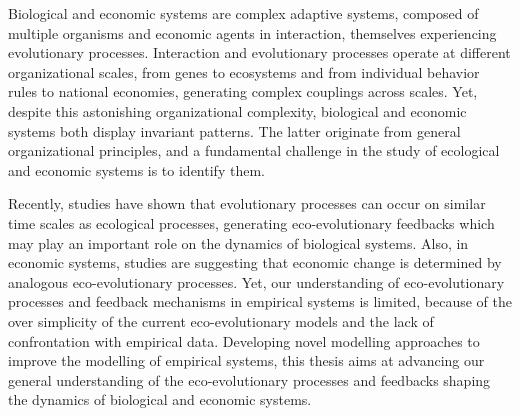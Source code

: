 %
\label{sec:summary}
\small{
Biological and economic systems are complex adaptive systems, composed of multiple organisms and economic agents in interaction, themselves experiencing evolutionary processes.
% 
Interaction and evolutionary processes operate at different organizational scales, from genes to ecosystems and from individual behavior rules to national economies, generating complex couplings across scales. Yet, despite this astonishing organizational complexity, biological and economic systems both display invariant patterns. 
% 
%
The latter originate from general organizational principles, and a fundamental challenge in the study of ecological and economic systems is to identify them.

Recently, studies have shown that evolutionary processes can occur on similar time scales as ecological processes, generating eco-evolutionary feedbacks which may play an important role on the dynamics of biological systems. %
% 
Also, in economic systems, studies are suggesting that economic change is determined by analogous eco-evolutionary processes. 
Yet, our understanding of eco-evolutionary processes and feedback mechanisms in empirical systems is limited, because of the over simplicity of the current eco-evolutionary models and the lack of confrontation with empirical data. %
% 
% 
% 
Developing novel modelling approaches to improve the modelling of empirical systems, this thesis aims at advancing our general understanding of the eco-evolutionary processes and feedbacks shaping the dynamics of biological and economic systems.

}
